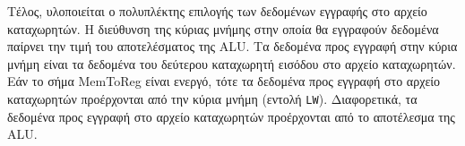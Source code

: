 Τέλος, υλοποιείται ο πολυπλέκτης επιλογής των δεδομένων εγγραφής στο αρχείο καταχωρητών. Η διεύθυνση της κύριας μνήμης στην οποία θα εγγραφούν δεδομένα παίρνει την τιμή του αποτελέσματος της ALU. Τα δεδομένα προς εγγραφή στην κύρια μνήμη είναι τα δεδομένα του δεύτερου καταχωρητή εισόδου στο αρχείο καταχωρητών. Εάν το σήμα MemToReg είναι ενεργό, τότε τα δεδομένα προς εγγραφή στο αρχείο καταχωρητών προέρχονται από την κύρια μνήμη (εντολή \texttt{LW}). Διαφορετικά, τα δεδομένα προς εγγραφή στο αρχείο καταχωρητών προέρχονται από το αποτέλεσμα της ALU.\par